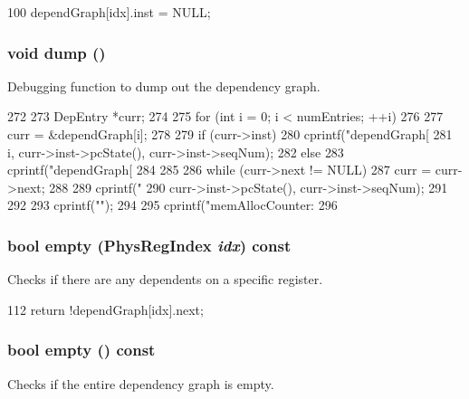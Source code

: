 \begin{DoxyCode}
100     { dependGraph[idx].inst = NULL; }
\end{DoxyCode}
\hypertarget{classDependencyGraph_accd2600060dbaee3a3b41aed4034c63c}{
\subsubsection[{dump}]{\setlength{\rightskip}{0pt plus 5cm}void dump ()}}
\label{classDependencyGraph_accd2600060dbaee3a3b41aed4034c63c}
Debugging function to dump out the dependency graph. 


\begin{DoxyCode}
272 {
273     DepEntry *curr;
274 
275     for (int i = 0; i < numEntries; ++i)
276     {
277         curr = &dependGraph[i];
278 
279         if (curr->inst) {
280             cprintf("dependGraph[%
281                     i, curr->inst->pcState(), curr->inst->seqNum);
282         } else {
283             cprintf("dependGraph[%
284         }
285 
286         while (curr->next != NULL) {
287             curr = curr->next;
288 
289             cprintf("%
290                     curr->inst->pcState(), curr->inst->seqNum);
291         }
292 
293         cprintf("\n");
294     }
295     cprintf("memAllocCounter: %
296 }
\end{DoxyCode}
\hypertarget{classDependencyGraph_a790abdbbdb5625ac65e5e3702b1e1a43}{
\subsubsection[{empty}]{\setlength{\rightskip}{0pt plus 5cm}bool empty ({\bf PhysRegIndex} {\em idx}) const}}
\label{classDependencyGraph_a790abdbbdb5625ac65e5e3702b1e1a43}
Checks if there are any dependents on a specific register. 


\begin{DoxyCode}
112 { return !dependGraph[idx].next; }
\end{DoxyCode}
\hypertarget{classDependencyGraph_ac6e61de369e994009e36f344f99c15ad}{
\subsubsection[{empty}]{\setlength{\rightskip}{0pt plus 5cm}bool empty () const}}
\label{classDependencyGraph_ac6e61de369e994009e36f344f99c15ad}
Checks if the entire dependency graph is empty. 


